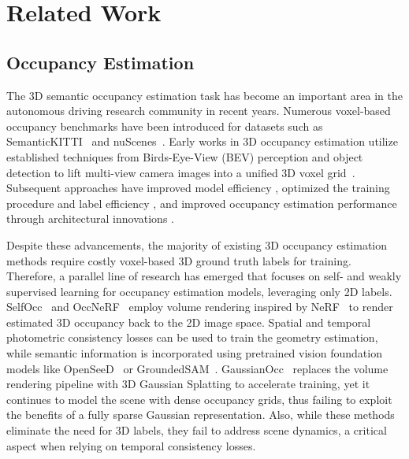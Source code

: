 \section{Related Work}
\subsection{Occupancy Estimation}
The 3D semantic occupancy estimation task has become an important area in the autonomous driving research community in recent years.
Numerous voxel-based occupancy benchmarks have been introduced for datasets such as SemanticKITTI~\cite{behley2019semantickitti} and nuScenes~\cite{tian2023occ3d, wang2023openoccupancy}.
Early works in 3D occupancy estimation utilize established techniques from Birds-Eye-View (BEV) perception and object detection \cite{huang2021bevdet,li2022bevformer} to lift multi-view camera images into a unified 3D voxel grid~\cite{huang2023tri, huang2022bevdet4d, tong2023scene, cao2022monoscene, li2023voxformer}.
Subsequent approaches have improved model efficiency \cite{yu2023flashocc, wang2024opus, lu2023octreeocc, liu2024fully, shi2025occupancy, tang2024sparseocc, huang2024gaussianformer}, optimized the training procedure and label efficiency \cite{pan2023renderocc, boeder2024occflownet, gan2023simple, hayler2024s4c, sun2024gsrender}, and improved occupancy estimation performance through architectural innovations \cite{li2023fb, zhang2023occformer, jiang2023symphonize, tan2024geocc, Zhao_2024_CVPR, ma2024cotr, ma2024cam4docc}.

Despite these advancements, the majority of existing 3D occupancy estimation methods require costly voxel-based 3D ground truth labels for training.
Therefore, a parallel line of research has emerged that focuses on self- and weakly supervised learning for occupancy estimation models, leveraging only 2D labels.
SelfOcc~\cite{huang2023selfocc} and OccNeRF~\cite{zhang2023occnerf} employ volume rendering inspired by NeRF~\cite{mildenhall2021nerf} to render estimated 3D occupancy back to the 2D image space. 
Spatial and temporal photometric consistency losses can be used to train the geometry estimation, while semantic information is incorporated using pretrained vision foundation models like OpenSeeD~\cite{zhang2023simple} or GroundedSAM~\cite{ren2024grounded}.
GaussianOcc~\cite{gan2024gaussianocc} replaces the volume rendering pipeline with 3D Gaussian Splatting to accelerate training, yet it continues to model the scene with dense occupancy grids, thus failing to exploit the benefits of a fully sparse Gaussian representation.
Also, while these methods eliminate the need for 3D labels, they fail to address scene dynamics, a critical aspect when relying on temporal consistency losses.

